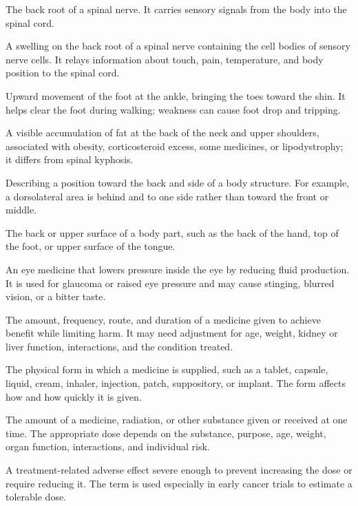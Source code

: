  The back root of a spinal nerve. It carries sensory signals from the body into the spinal cord.

 A swelling on the back root of a spinal nerve containing the cell bodies of sensory nerve cells. It relays information about touch, pain, temperature, and body position to the spinal cord.

 Upward movement of the foot at the ankle, bringing the toes toward the shin. It helps clear the foot during walking; weakness can cause foot drop and tripping.

 A visible accumulation of fat at the back of the neck and upper shoulders, associated with obesity, corticosteroid excess, some medicines, or lipodystrophy; it differs from spinal kyphosis.

 Describing a position toward the back and side of a body structure. For example, a dorsolateral area is behind and to one side rather than toward the front or middle.

 The back or upper surface of a body part, such as the back of the hand, top of the foot, or upper surface of the tongue.

 An eye medicine that lowers pressure inside the eye by reducing fluid production. It is used for glaucoma or raised eye pressure and may cause stinging, blurred vision, or a bitter taste.

 The amount, frequency, route, and duration of a medicine given to achieve benefit while limiting harm. It may need adjustment for age, weight, kidney or liver function, interactions, and the condition treated.

 The physical form in which a medicine is supplied, such as a tablet, capsule, liquid, cream, inhaler, injection, patch, suppository, or implant. The form affects how and how quickly it is given.

 The amount of a medicine, radiation, or other substance given or received at one time. The appropriate dose depends on the substance, purpose, age, weight, organ function, interactions, and individual risk.

 A treatment-related adverse effect severe enough to prevent increasing the dose or require reducing it. The term is used especially in early cancer trials to estimate a tolerable dose.

